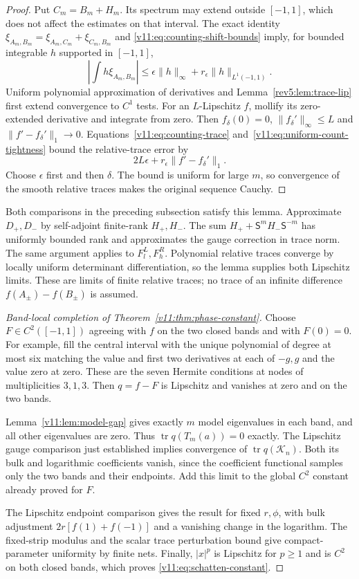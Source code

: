 \begin{proof}
Put $C_m=B_m+H_m$.  Its spectrum may extend outside $[-1,1]$, which
does not affect the estimates on that interval.  The exact identity
$\xi_{A_m,B_m}=\xi_{A_m,C_m}+\xi_{C_m,B_m}$ and
\eqref{v11:eq:counting-shift-bounds} imply, for bounded integrable $h$
supported in $[-1,1]$,
\begin{equation}\label{v11:eq:uniform-count-tightness}
 \left|\int h\xi_{A_m,B_m}\right|
 \le\epsilon\|h\|_\infty+r_\epsilon\|h\|_{L^1(-1,1)}.
\end{equation}
Uniform polynomial approximation of derivatives and
Lemma~\ref{rev5:lem:trace-lip} first extend convergence to $C^1$ tests.
For an $L$-Lipschitz $f$, mollify its zero-extended derivative and
integrate from zero. Then $f_\delta(0)=0$, $\|f_\delta'\|_\infty\le L$
and $\|f'-f_\delta'\|_1\to0$. Equations~\eqref{v11:eq:counting-trace}
and~\eqref{v11:eq:uniform-count-tightness} bound the relative-trace error by
\[
 2L\epsilon+r_\epsilon\|f'-f_\delta'\|_1.
\]
Choose $\epsilon$ first and then $\delta$. The bound is uniform for
large $m$, so convergence of the smooth relative traces makes the
original sequence Cauchy.
\end{proof}

Both comparisons in the preceding subsection satisfy this lemma.
Approximate $D_+,D_-$ by self-adjoint finite-rank $H_+,H_-$.
The sum $H_++\mathsf S^mH_-\mathsf S^{-m}$ has uniformly bounded rank
and approximates the gauge correction in trace norm. The same argument
applies to $F_l^L,F_h^R$. Polynomial relative traces converge by
locally uniform determinant differentiation, so the lemma supplies both
Lipschitz limits. These are limits of finite relative traces; no trace
of an infinite difference $f(A_\pm)-f(B_\pm)$ is assumed.

\begin{proof}[Band-local completion of Theorem~\ref{v11:thm:phase-constant}]
Choose $F\in C^2([-1,1])$ agreeing with $f$ on the two closed bands and
with $F(0)=0$.  For example, fill the central interval with the unique
polynomial of degree at most six matching the value and first two
derivatives at each of $-g,g$ and the value zero at zero.  These are the
seven Hermite conditions at nodes of multiplicities $3,1,3$.
Then $q=f-F$ is Lipschitz and vanishes at zero and on the two bands.

Lemma~\ref{v11:lem:model-gap} gives
exactly $m$ model eigenvalues in each band, and all other eigenvalues
are zero.  Thus $\operatorname{tr}q(T_m(a))=0$ exactly.  The Lipschitz
gauge comparison just established implies convergence of
$\operatorname{tr}q(\mathcal K_n)$.  Both its bulk and logarithmic
coefficients vanish, since the coefficient functional samples only the
two bands and their endpoints.  Add this limit to the global $C^2$
constant already proved for $F$.

The Lipschitz endpoint comparison gives the result for fixed $r,\phi$,
with bulk adjustment $2r[f(1)+f(-1)]$ and a vanishing change in the
logarithm.  The fixed-strip modulus and the scalar trace perturbation
bound give compact-parameter uniformity by finite nets.  Finally,
$|x|^p$ is Lipschitz for $p\ge1$ and is $C^2$ on both closed bands,
which proves \eqref{v11:eq:schatten-constant}.
\end{proof}

